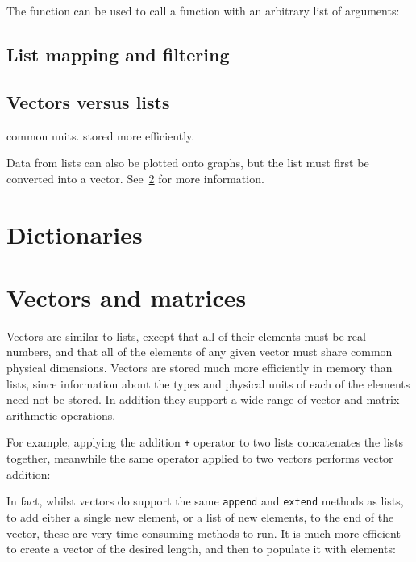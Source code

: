 The  function can be used to call a function with an
arbitrary list of arguments:

\vspace{3mm}

\vspace{3mm}

\subsection{List mapping and filtering}
\label{sec:listfilter}

\subsection{Vectors versus lists}

common units. stored more efficiently.

Data from lists can also be plotted onto graphs, but the list must first be
converted into a vector. See~\ref{sec:vectors} for more information.

\section{Dictionaries}

\section{Vectors and matrices}
\label{sec:vectors}

Vectors are similar to lists, except that all of their elements must be real
numbers, and that all of the elements of any given vector must share common
physical dimensions.  Vectors are stored much more efficiently in memory than
lists, since information about the types and physical units of each of the
elements need not be stored. In addition they support a wide range of vector
and matrix arithmetic operations.

For example, applying the addition {\tt +} operator to two lists concatenates
the lists together, meanwhile the same operator applied to two vectors performs
vector addition:

\vspace{3mm}

\vspace{3mm}

In fact, whilst vectors do support the same {\tt append} and {\tt extend}
methods as lists, to add either a single new element, or a list of new
elements, to the end of the vector, these are very time consuming methods to
run. It is much more efficient to create a vector of the desired length, and
then to populate it with elements:

